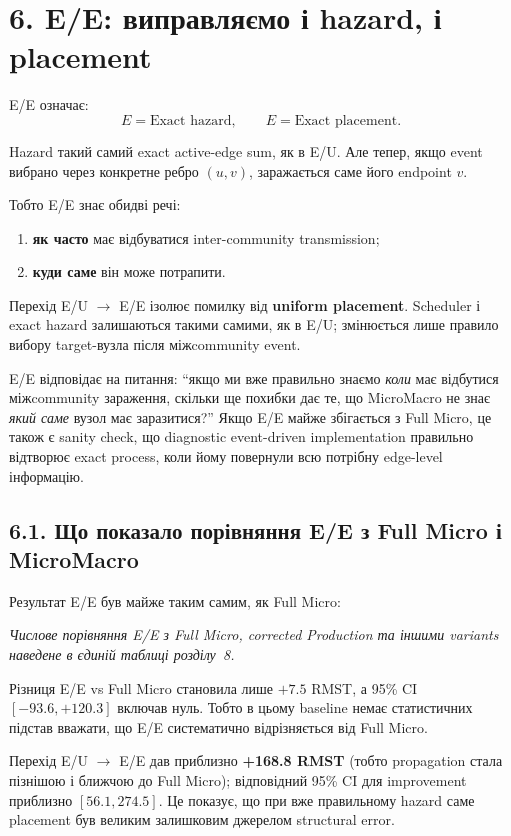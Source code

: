 \documentclass[11pt,a4paper]{article}
\begin{document}
\section*{6. E/E: виправляємо і hazard, і placement}

E/E означає:
\[
 \boxed{E=\text{Exact hazard}},\qquad
 \boxed{E=\text{Exact placement}}.
\]

Hazard такий самий exact active-edge sum, як в E/U. Але тепер, якщо event вибрано через конкретне ребро $(u,v)$, заражається саме його endpoint $v$.

Тобто E/E знає обидві речі:
\begin{enumerate}[nosep]
\item \textbf{як часто} має відбуватися inter-community transmission;
\item \textbf{куди саме} він може потрапити.
\end{enumerate}

Перехід E/U $\to$ E/E ізолює помилку від \textbf{uniform placement}. Scheduler і exact hazard залишаються такими самими, як в E/U; змінюється лише правило вибору target-вузла після міжcommunity event.

\begin{tcolorbox}[colback=white,colframe=exact,title=Що саме перевіряє E/E?]
E/E відповідає на питання: ``якщо ми вже правильно знаємо \textit{коли} має відбутися міжcommunity зараження, скільки ще похибки дає те, що MicroMacro не знає \textit{який саме} вузол має заразитися?'' Якщо E/E майже збігається з Full Micro, це також є sanity check, що diagnostic event-driven implementation правильно відтворює exact process, коли йому повернули всю потрібну edge-level інформацію.
\end{tcolorbox}

\subsection*{6.1. Що показало порівняння E/E з Full Micro і MicroMacro}

Результат E/E був майже таким самим, як Full Micro:

\textit{Числове порівняння E/E з Full Micro, corrected Production та іншими variants наведене в єдиній таблиці розділу~8.}

Різниця E/E vs Full Micro становила лише $+7.5$ RMST, а 95\% CI $[-93.6,+120.3]$ включав нуль. Тобто в цьому baseline немає статистичних підстав вважати, що E/E систематично відрізняється від Full Micro.

Перехід E/U $\to$ E/E дав приблизно \textbf{+168.8 RMST} (тобто propagation стала пізнішою і ближчою до Full Micro); відповідний 95\% CI для improvement приблизно $[56.1,274.5]$. Це показує, що при вже правильному hazard саме placement був великим залишковим джерелом structural error.
\end{document}
